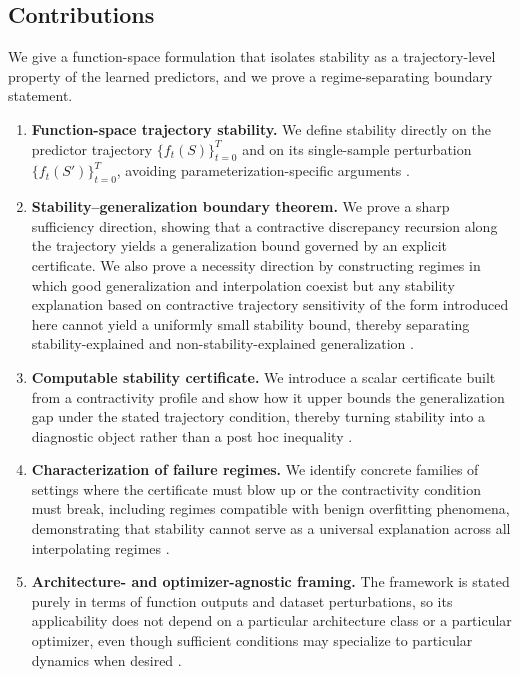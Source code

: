 \documentclass{article}
\numberwithin{equation}{section}
\begin{document}
\subsection{Contributions}

We give a function-space formulation that isolates stability as a trajectory-level property of the learned predictors, and we prove a regime-separating boundary statement.

\begin{enumerate}%
	\item \textbf{Function-space trajectory stability.}
	We define stability directly on the predictor trajectory $\{f_t(S)\}_{t=0}^T$ and on its single-sample perturbation $\{f_t(S')\}_{t=0}^T$, avoiding parameterization-specific arguments \cite{bousquet2002stability}.
	
	\item \textbf{Stability--generalization boundary theorem.}
	We prove a sharp sufficiency direction, showing that a contractive discrepancy recursion along the trajectory yields a generalization bound governed by an explicit certificate.
	We also prove a necessity direction by constructing regimes in which good generalization and interpolation coexist but any stability explanation based on contractive trajectory sensitivity of the form introduced here cannot yield a uniformly small stability bound, thereby separating stability-explained and non-stability-explained generalization \cite{BartlettLongLugosiTsigler2020}.
	
	\item \textbf{Computable stability certificate.}
	We introduce a scalar certificate built from a contractivity profile and show how it upper bounds the generalization gap under the stated trajectory condition, thereby turning stability into a diagnostic object rather than a post hoc inequality \cite{pmlr-v48-hardt16}.
	
	\item \textbf{Characterization of failure regimes.}
	We identify concrete families of settings where the certificate must blow up or the contractivity condition must break, including regimes compatible with benign overfitting phenomena, demonstrating that stability cannot serve as a universal explanation across all interpolating regimes \cite{BartlettLongLugosiTsigler2020}.
	
	\item \textbf{Architecture- and optimizer-agnostic framing.}
	The framework is stated purely in terms of function outputs and dataset perturbations, so its applicability does not depend on a particular architecture class or a particular optimizer, even though sufficient conditions may specialize to particular dynamics when desired \cite{NagarajanKolter2019}.
\end{enumerate}
\end{document}
